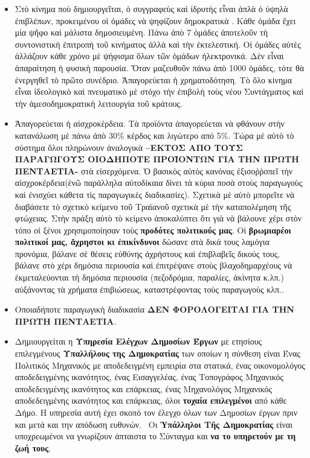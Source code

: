 \documentclass[a4paper]{article}
\begin{document}
\begin{itemize}
\item Στὸ κίνημα ποὺ δημιουργεῖται, ὁ συγγραφεὺς καὶ ἱδρυτὴς εἶναι ἁπλὰ ὁ ὑψηλὰ ἐπιβλέπων, προκειμένου οἱ ὁμάδες νὰ ψηφίζουν δημοκρατικὰ . Κάθε ὁμάδα ἔχει μία ψῆφο καὶ μάλιστα δημοσιευμένη. Πάνω ἀπὸ 7 ὁμάδες ἀποτελοῦν τὴ συντονιστικὴ ἐπιτροπὴ τοῦ κινήματος ἀλλὰ καὶ τὴν ἐκτελεστική. Οἱ ὁμάδες αὐτὲς ἀλλάζουν κάθε χρόνο μὲ ψήφισμα ὅλων τῶν ὁμάδων ἠλεκτρονικά. Δὲν εἶναι ἀπαραίτηση ἡ φυσικὴ παρουσία. Ὅταν μαζευθοῦν πάνω ἀπὸ 1000 ὁμάδες, τότε θὰ ἐνεργηθεῖ τὸ πρῶτο συνέδριο. Ἀπαγορεύεται ἡ χρηματοδότηση. Τὸ ὅλο κίνημα εἶναι ἰδεολογικὸ καὶ πνευματικὸ μὲ στόχο τὴν ἐπιβολὴ τοὺς νέου Συντάγματος καὶ τὴν ἀμεσοδημοκρατικὴ λειτουργία τοῦ κράτους.
\item Ἀπαγορεύεται ἡ αἰσχροκέρδεια. Τὰ προϊόντα ἀπαγορεύεται νὰ φθάνουν στὴν κατανάλωση μὲ πάνω ἀπὸ 30\% κέρδος και λιγώτερο από 5\%. Τώρα μὲ αὐτὸ τὸ σύστημα ὅλοι πληρώνουν ἀναλογικὰ \textbf{--ΕΚΤΟΣ ΑΠΟ ΤΟΥΣ ΠΑΡΑΓΩΓΟΥΣ ΟΙΟΔΗΠΟΤΕ ΠΡΟΪΟΝΤΩΝ ΓΙΑ ΤΗΝ ΠΡΩΤΗ ΠΕΝΤΑΕΤΙΑ-} στὰ εἰσερχόμενα. Ὁ βασικὸς αὐτὸς κανόνας ἐξισοῤῥοπεῖ τὴν αἰσχροκέρδεια(ἐνῶ παράλληλα αὐτοδίκαια δίνει τὰ κύρια ποσὰ στοὺς παραγωγοὺς καὶ ἐνισχύει κάθετα τὶς παραγωγικὲς διαδικασίες). Σχετικὰ μὲ αὐτὸ μπορεῖτε νὰ διαβάσετε τὸ σχετικὸ κείμενο τοῦ Τραϊανοῦ σχετικὰ μὲ τὴν καταπολέμηση τῆς φτώχειας. Στὴν πράξη αὐτὸ τὸ κείμενο ἀποκαλύπτει ὅτι γιὰ νὰ βάλουνε χέρι στὸν τόπο οἱ ξένοι χρησιμοποίησαν τοὺς \textbf{προδότες πολιτικούς μας}. Οἱ \textbf{βρωμιαρέοι πολιτικοί μας, ἄχρηστοι κι ἐπικίνδυνοι} δώσανε στὰ δικά τους λαμόγια προνόμια, βάλανε σὲ θέσεις εὐθύνης ἀχρήστους καὶ ἐπιβλαβεῖς δικούς τους, βάλανε στὸ χέρι δημόσια περιουσία καὶ ἐπιτρέψανε στοὺς βλαχοδημαρχέους νὰ ἐκμεταλεύονται τὴ δημόσια περιουσία (πεζοδρόμια, παραλίες, ἀκίνητα κ.λπ.) αὐξάνοντας τὰ χρήματα ἐπιβιώσεως, καταστρέφοντας τοὺς παραγωγοὺς κλπ..
\item Οποιαδήποτε παραγωγική διαδικασία \textbf{ΔΕΝ ΦΟΡΟΛΟΓΕΙΤΑΙ ΓΙΑ ΤΗΝ ΠΡΩΤΗ ΠΕΝΤΑΕΤΙΑ}.
\item Δημιουργείται η \textbf{Υπηρεσία Ελέγχων Δημοσίων Έργων} με ετησίους επιλεγμένους \textbf{Υπαλλήλους της Δημοκρατίας} των οποίων η σύνθεση είναι Ένας Πολιτικός Μηχανικός με αποδεδειγμένη εμπειρία στα στατικά, ένας οικονομολόγος αποδεδειγμένης ικανότητος, ένας Εισαγγελέας, ένας Τοπογράφος Μηχανικός αποδεδειγμένης ικανότητος και επάρκειας, ένας Μηχανολόγος Μηχανικός αποδεδειγμένης ικανότητος και επάρκειας, όλοι \textbf{τυχαία επιλεγμένοι} από κάθε Δήμο. Η υπηρεσία αυτή έχει σκοπό τον έλεγχο όλων των Δημοσίων έργων πριν και μετά και την απόδωση ευθυνών.
\ Οι \textbf{Ὑπάλληλοι Τῆς Δημοκρατίας} είναι υποχρεωμένοι να γνωρίζουν άπταιστα το Σύνταγμα και \textbf{να το υπηρετούν με τη ζωή τους}.

\end{itemize}
\end{document}
